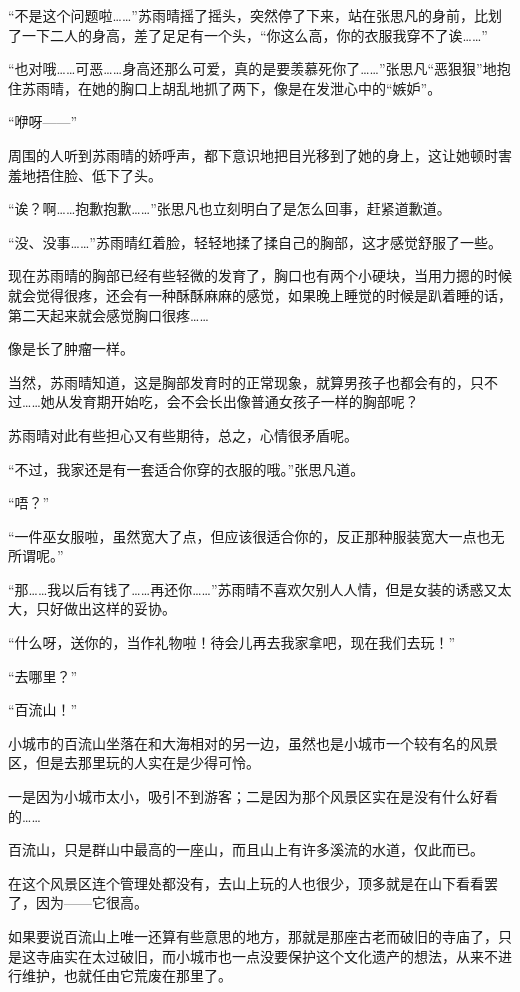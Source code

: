 “不是这个问题啦……”苏雨晴摇了摇头，突然停了下来，站在张思凡的身前，比划了一下二人的身高，差了足足有一个头，“你这么高，你的衣服我穿不了诶……”

“也对哦……可恶……身高还那么可爱，真的是要羡慕死你了……”张思凡“恶狠狠”地抱住苏雨晴，在她的胸口上胡乱地抓了两下，像是在发泄心中的“嫉妒”。

“咿呀——”

周围的人听到苏雨晴的娇呼声，都下意识地把目光移到了她的身上，这让她顿时害羞地捂住脸、低下了头。

“诶？啊……抱歉抱歉……”张思凡也立刻明白了是怎么回事，赶紧道歉道。

“没、没事……”苏雨晴红着脸，轻轻地揉了揉自己的胸部，这才感觉舒服了一些。

现在苏雨晴的胸部已经有些轻微的发育了，胸口也有两个小硬块，当用力摁的时候就会觉得很疼，还会有一种酥酥麻麻的感觉，如果晚上睡觉的时候是趴着睡的话，第二天起来就会感觉胸口很疼……

像是长了肿瘤一样。

当然，苏雨晴知道，这是胸部发育时的正常现象，就算男孩子也都会有的，只不过……她从发育期开始吃，会不会长出像普通女孩子一样的胸部呢？

苏雨晴对此有些担心又有些期待，总之，心情很矛盾呢。

“不过，我家还是有一套适合你穿的衣服的哦。”张思凡道。

“唔？”

“一件巫女服啦，虽然宽大了点，但应该很适合你的，反正那种服装宽大一点也无所谓呢。”

“那……我以后有钱了……再还你……”苏雨晴不喜欢欠别人人情，但是女装的诱惑又太大，只好做出这样的妥协。

“什么呀，送你的，当作礼物啦！待会儿再去我家拿吧，现在我们去玩！”

“去哪里？”

“百流山！”

小城市的百流山坐落在和大海相对的另一边，虽然也是小城市一个较有名的风景区，但是去那里玩的人实在是少得可怜。

一是因为小城市太小，吸引不到游客；二是因为那个风景区实在是没有什么好看的……

百流山，只是群山中最高的一座山，而且山上有许多溪流的水道，仅此而已。

在这个风景区连个管理处都没有，去山上玩的人也很少，顶多就是在山下看看罢了，因为——它很高。

如果要说百流山上唯一还算有些意思的地方，那就是那座古老而破旧的寺庙了，只是这寺庙实在太过破旧，而小城市也一点没要保护这个文化遗产的想法，从来不进行维护，也就任由它荒废在那里了。

